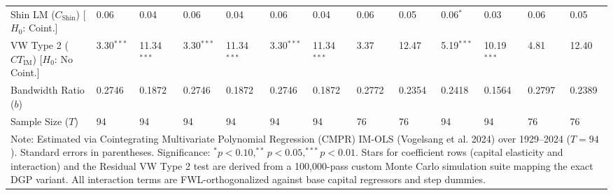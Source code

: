 \begin{table}[H]
\begin{tabular}{p{3.8cm}p{1.1cm}p{1.1cm}p{1.1cm}p{1.1cm}p{1.1cm}p{1.1cm}p{1.1cm}p{1.1cm}p{1.1cm}p{1.1cm}p{1.1cm}p{1.1cm}}
Shin LM ($C_{\text{Shin}}$) [$H_0$: Coint.] & 0.06 & 0.04 & 0.06 & 0.04 & 0.06 & 0.04 & 0.06 & 0.05 & 0.06$^{*}$ & 0.03 & 0.06 & 0.05 \\
VW Type 2 ($CT_{\text{IM}}$) [$H_0$: No Coint.] & 3.30$^{***}$ & 11.34$^{***}$ & 3.30$^{***}$ & 11.34$^{***}$ & 3.30$^{***}$ & 11.34$^{***}$ & 3.37 & 12.47 & 5.19$^{***}$ & 10.19$^{***}$ & 4.81 & 12.40 \\
\midrule
Bandwidth Ratio ($b$) & 0.2746 & 0.1872 & 0.2746 & 0.1872 & 0.2746 & 0.1872 & 0.2772 & 0.2354 & 0.2418 & 0.1564 & 0.2797 & 0.2389 \\
Sample Size ($T$) & 94 & 94 & 94 & 94 & 94 & 94 & 76 & 76 & 94 & 94 & 76 & 76 \\
\bottomrule
\multicolumn{13}{p{14.5cm}}{\footnotesize Note: Estimated via Cointegrating Multivariate Polynomial Regression (CMPR) IM-OLS (Vogelsang et al. 2024) over 1929--2024 ($T=94$). Standard errors in parentheses. Significance: $^* p < 0.10, ^{**} p < 0.05, ^{***} p < 0.01$. Stars for coefficient rows (capital elasticity and interaction) and the Residual VW Type 2 test are derived from a 100,000-pass custom Monte Carlo simulation suite mapping the exact DGP variant. All interaction terms are FWL-orthogonalized against base capital regressors and step dummies.}
\end{tabular}
\end{table}
